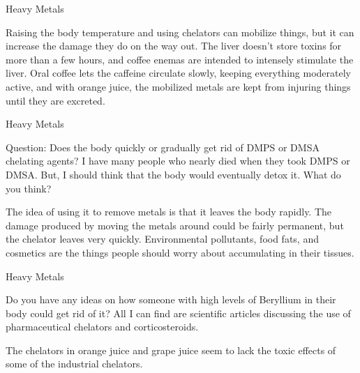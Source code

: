 \documentclass[11pt,oneside,openany,extrafontsizes]{memoir}
\begin{document}
\begin{standalonequote}{Heavy Metals}

    \begin{answer}
        Raising the body temperature and using chelators can mobilize things, but it can increase the damage they do on the way out. The liver doesn't store toxins for more than a few hours, and coffee enemas are intended to intensely stimulate the liver. Oral coffee lets the caffeine circulate slowly, keeping everything moderately active, and with orange juice, the mobilized metals are kept from injuring things until they are excreted.
    \end{answer}
\end{standalonequote}

\begin{qaexchange}{Heavy Metals}

    \begin{question}
        Question: Does the body quickly or gradually get rid of DMPS or DMSA chelating agents? I have many people who nearly died when they took DMPS or DMSA. But, I should think that the body would eventually detox it. What do you think?
    \end{question}

    \begin{answer}
        The idea of using it to remove metals is that it leaves the body rapidly. The damage produced by moving the metals around could be fairly permanent, but the chelator leaves very quickly. Environmental pollutants, food fats, and cosmetics are the things people should worry about accumulating in their tissues.
    \end{answer}
\end{qaexchange}

\begin{qaexchange}{Heavy Metals}

    \begin{question}
        Do you have any ideas on how someone with high levels of Beryllium in their body could get rid of it? All I can find are scientific articles discussing the use of pharmaceutical chelators and corticosteroids.
    \end{question}

    \begin{answer}
        The chelators in orange juice and grape juice seem to lack the toxic effects of some of the industrial chelators.
    \end{answer}
\end{qaexchange}
\end{document}
